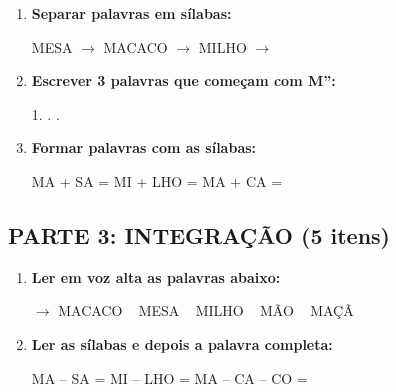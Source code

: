 \begin{exercicio}
\begin{enumerate}[resume]
  \item \textbf{Separar palavras em sílabas:}
  \begin{center}
  MESA $\rightarrow$ \underline{\hspace{1.5cm}} \quad MACACO $\rightarrow$ \underline{\hspace{1.5cm}} \quad MILHO $\rightarrow$ \underline{\hspace{1.5cm}}
  \end{center}

  \item \textbf{Escrever 3 palavras que começam com M'':}
  \begin{center}
  1. \underline{\hspace{3cm}} . \underline{\hspace{3cm}} . \underline{\hspace{3cm}}
  \end{center}

  \item \textbf{Formar palavras com as sílabas:}
  \begin{center}
  MA + SA = \underline{\hspace{2cm}} \quad MI + LHO = \underline{\hspace{2cm}} \quad MA + CA = \underline{\hspace{2cm}}
  \end{center}
\end{enumerate}

\subsection*{PARTE 3: INTEGRAÇÃO (5 itens)}

\begin{enumerate}[resume]
  \item \textbf{Ler em voz alta as palavras abaixo:}
  \begin{center}
  $\rightarrow$ MACACO  ~  MESA  ~  MILHO  ~  MÃO  ~  MAÇÃ
  \end{center}

  \item \textbf{Ler as sílabas e depois a palavra completa:}
  \begin{center}
  MA -- SA = \underline{\hspace{2cm}} \quad MI -- LHO = \underline{\hspace{2cm}} \quad MA -- CA -- CO = \underline{\hspace{2cm}}
  \end{center}


\end{enumerate}
\end{exercicio}
